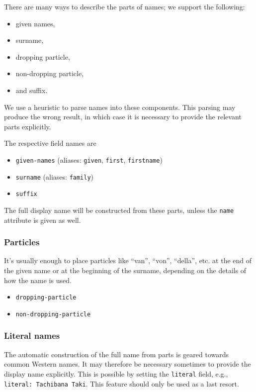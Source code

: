 \documentclass[
]{article}
\providecommand{\tightlist}{%
  \setlength{\itemsep}{0pt}\setlength{\parskip}{0pt}}
\begin{document}
There are many ways to describe the parts of names; we support the
following:

\begin{itemize}
\tightlist
\item
  given names,
\item
  surname,
\item
  dropping particle,
\item
  non-dropping particle,
\item
  and suffix.
\end{itemize}

We use a heuristic to parse names into these components. This parsing
may produce the wrong result, in which case it is necessary to provide
the relevant parts explicitly.

The respective field names are

\begin{itemize}
\tightlist
\item
  \texttt{given-names} (aliases: \texttt{given}, \texttt{first},
  \texttt{firstname})
\item
  \texttt{surname} (aliases: \texttt{family})
\item
  \texttt{suffix}
\end{itemize}

The full display name will be constructed from these parts, unless the
\texttt{name} attribute is given as well.

\hypertarget{particles}{%
\subsubsection{Particles}\label{particles}}

It's usually enough to place particles like ``van'', ``von'', ``della'',
etc. at the end of the given name or at the beginning of the surname,
depending on the details of how the name is used.

\begin{itemize}
\tightlist
\item
  \texttt{dropping-particle}
\item
  \texttt{non-dropping-particle}
\end{itemize}

\hypertarget{literal-names}{%
\subsubsection{Literal names}\label{literal-names}}

The automatic construction of the full name from parts is geared towards
common Western names. It may therefore be necessary sometimes to provide
the display name explicitly. This is possible by setting the
\texttt{literal} field, e.g., \texttt{literal:\ Tachibana\ Taki}. This
feature should only be used as a last resort.
\end{document}
